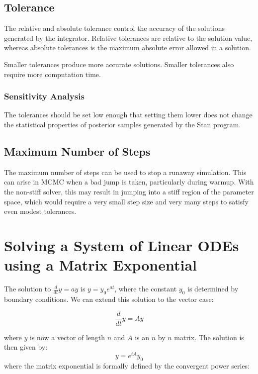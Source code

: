 \subsection{Tolerance}

The relative and absolute tolerance control the accuracy of the
solutions generated by the integrator.  Relative tolerances are
relative to the solution value, whereas absolute tolerances is the
maximum absolute error allowed in a solution.  

Smaller tolerances produce more accurate solutions.  Smaller
tolerances also require more computation time.  

\subsubsection{Sensitivity Analysis}

The tolerances should be set low enough that setting them lower does
not change the statistical properties of posterior samples generated
by the Stan program.

\subsection{Maximum Number of Steps}

The maximum number of steps can be used to stop a runaway simulation.
This can arise in MCMC when a bad jump is taken, particularly during
warmup.  With the non-stiff solver, this may result in jumping into a
stiff region of the parameter space, which would require a very small
step size and very many steps to satisfy even modest tolerances.  

\section{Solving a System of Linear ODEs using a Matrix Exponential}

The solution to $\frac{d}{dt} y = ay$ is $y = y_0e^{at}$, where the constant
$y_0$ is determined by boundary conditions. We can extend this solution
to the vector case:

\begin{equation}\label{ode.linODEs}
\frac{d}{dt}y = A y
\end{equation}

where $y$ is now a vector of length $n$ and $A$ is an $n$ by $n$ matrix. The
solution is then given by:
\begin{equation}\label{ode.linOEs.sln}
y = e^{tA}y_0
\end{equation}
where the matrix exponential is formally defined by the convergent power series:

